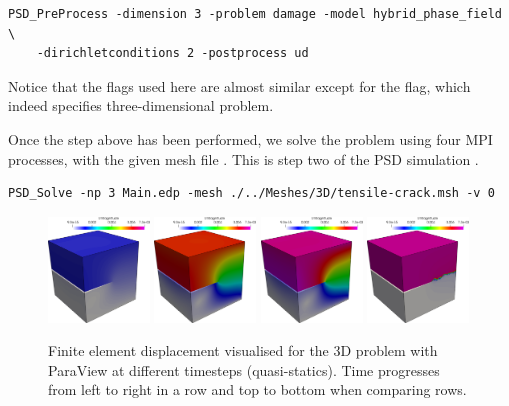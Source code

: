 \begin{lstlisting}[style=BashInputStyle]
	PSD_PreProcess -dimension 3 -problem damage -model hybrid_phase_field  \
	-dirichletconditions 2 -postprocess ud 
\end{lstlisting}

Notice that the flags used here are almost similar except for the    flag, which indeed specifies three-dimensional problem.

Once the step above has been performed, we solve the problem using four MPI processes, with the given mesh file . This is step two of the PSD simulation   .

\begin{lstlisting}[style=BashInputStyle]
	PSD_Solve -np 3 Main.edp -mesh ./../Meshes/3D/tensile-crack.msh -v 0
\end{lstlisting}

\begin{figure}[h!]
	\centering
	
	\includegraphics[width=0.24\textwidth]{./Images/u3d0.png}
	\includegraphics[width=0.24\textwidth]{./Images/u3d1.png} 
	\includegraphics[width=0.24\textwidth]{./Images/u3d2.png}
	\includegraphics[width=0.24\textwidth]{./Images/u3d3.png}
	\caption{Finite element displacement visualised for the 3D problem with ParaView at different timesteps (quasi-statics). Time progresses from left to right in a row and top to bottom when comparing rows. \label{u3d-fem}}
\end{figure}



